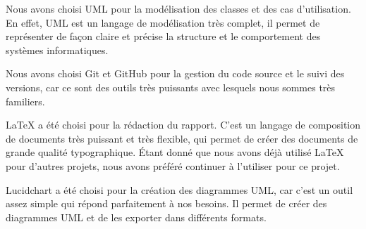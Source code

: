 Nous avons choisi UML pour la modélisation des classes et des cas d'utilisation. En effet, UML
est un langage de modélisation très complet, il permet de représenter de
façon claire et précise la structure et le comportement des systèmes informatiques.

Nous avons choisi Git et GitHub pour la gestion du code source et le suivi des
versions, car ce sont des outils très puissants avec lesquels nous sommes très
familiers.

LaTeX a été choisi pour la rédaction du rapport. C'est un langage de
composition de documents très puissant et très flexible, qui permet de créer des
documents de grande qualité typographique.
Étant donné que nous avons déjà utilisé LaTeX pour d'autres projets, nous avons
préféré continuer à l'utiliser pour ce projet.

Lucidchart a été choisi pour la création des diagrammes UML, car c'est un outil assez
simple qui répond parfaitement à nos besoins. Il permet de créer des diagrammes
UML et de les exporter dans différents formats.

